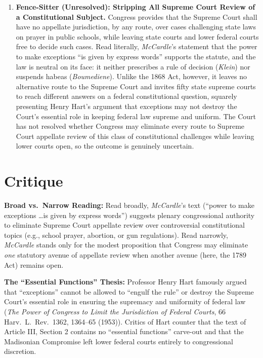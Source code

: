 \documentclass[12pt]{article}
\begin{document}
\begin{enumerate}
\item \textbf{Fence-Sitter (Unresolved): Stripping All Supreme Court Review of a Constitutional Subject.} Congress provides that the Supreme Court shall have no appellate jurisdiction, by any route, over cases challenging state laws on prayer in public schools, while leaving state courts and lower federal courts free to decide such cases. Read literally, \textit{McCardle}'s statement that the power to make exceptions ``is given by express words'' supports the statute, and the law is neutral on its face: it neither prescribes a rule of decision (\textit{Klein}) nor suspends habeas (\textit{Boumediene}). Unlike the 1868 Act, however, it leaves no alternative route to the Supreme Court and invites fifty state supreme courts to reach different answers on a federal constitutional question, squarely presenting Henry Hart's argument that exceptions may not destroy the Court's essential role in keeping federal law supreme and uniform. The Court has not resolved whether Congress may eliminate every route to Supreme Court appellate review of this class of constitutional challenges while leaving lower courts open, so the outcome is genuinely uncertain.

\end{enumerate}

\section{Critique}
\textbf{Broad vs.\ Narrow Reading:} Read broadly, \textit{McCardle}'s text (``power to make exceptions \dots is given by express words'') suggests plenary congressional authority to eliminate Supreme Court appellate review over controversial constitutional topics (e.g., school prayer, abortion, or gun regulations). Read narrowly, \textit{McCardle} stands only for the modest proposition that Congress may eliminate \emph{one} statutory avenue of appellate review when another avenue (here, the 1789 Act) remains open.

\textbf{The ``Essential Functions'' Thesis:} Professor Henry Hart famously argued that ``exceptions'' cannot be allowed to ``engulf the rule'' or destroy the Supreme Court's essential role in ensuring the supremacy and uniformity of federal law (\textit{The Power of Congress to Limit the Jurisdiction of Federal Courts}, 66 Harv.\ L.\ Rev.\ 1362, 1364--65 (1953)). Critics of Hart counter that the text of Article III, Section 2 contains no ``essential functions'' carve-out and that the Madisonian Compromise left lower federal courts entirely to congressional discretion.
\end{document}
